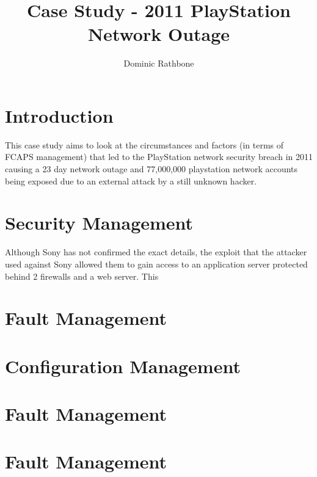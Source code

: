 \documentclass[]{report}
\title{Case Study - 2011 PlayStation Network Outage}
\author{Dominic Rathbone}
\begin{document}
\maketitle

\section{Introduction}
	This case study aims to look at the circumstances and factors (in terms of FCAPS management) that led to the PlayStation network security breach in 2011 causing a 23 day network outage and 77,000,000 playstation network accounts being exposed due to an external attack by a still unknown hacker.

\section{Security Management}
	Although Sony has not confirmed the exact details, the exploit that the attacker used against Sony allowed them to gain access to an application server protected behind 2 firewalls and a web server. This 
\section{Fault Management}
\section{Configuration Management}
\section{Fault Management}
\section{Fault Management}

\begin{thebibliography}{20}
\end{thebibliography}
\end{document}
